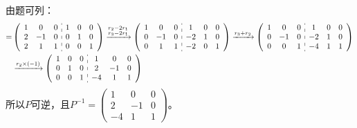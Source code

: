 \documentclass[a4paper]{report}
\begin{document}
\begin{jie}
由题可列：
\begin{align*}
[P|E]=&
\left(
 \begin{array}{c:c}
\begin{matrix}
1&0&0\\
2&-1&0\\
2&1&1
\end{matrix}&
\begin{matrix}
1&0&0\\
0&1&0\\
0&0&1
\end{matrix}
\end{array}
\right)\xrightarrow{\substack{r_{2}-2 r_{1}\\ r_3-2r_1}}
{
\left(
 \begin{array}{c:c}
\begin{matrix}
1&0&0\\
0&-1&0\\
0&1&1
\end{matrix}&
\begin{matrix}
1&0&0\\
-2&1&0\\
-2&0&1
\end{matrix}
\end{array}
\right)
}\xrightarrow{\substack{r_{3}+r_2}}
{
\left(
 \begin{array}{c:c}
\begin{matrix}
1&0&0\\
0&-1&0\\
0&0&1
\end{matrix}&
\begin{matrix}
1&0&0\\
-2&1&0\\
-4&1&1
\end{matrix}
\end{array}
\right)
}\\
&\xrightarrow{\substack{r_{2}\times(-1)}}
{
\left(
 \begin{array}{c:c}
\begin{matrix}
1&0&0\\
0&1&0\\
0&0&1
\end{matrix}&
\begin{matrix}
1&0&0\\
2&-1&0\\
-4&1&1
\end{matrix}
\end{array}
\right)
}
\end{align*}
所以$P$可逆，且$P^{-1}=
\begin{pmatrix}
1&0&0\\
2&-1&0\\
-4&1&1
\end{pmatrix}
$。


\end{jie}
\end{document}
